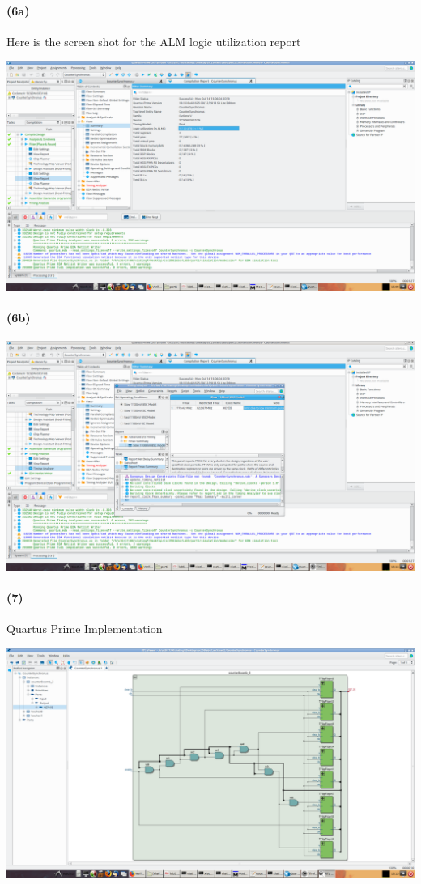 \documentclass{article}
\begin{document}
\paragraph{(6a)} Here is the screen shot for the ALM logic utilization report
\begin{center}
    \includegraphics[scale=0.25]{q1_6a.png}
\end{center}

\paragraph{(6b)} 
\begin{center}
    \includegraphics[scale=0.25]{q1_6b.png}
\end{center}

\paragraph{(7)} Quartus Prime Implementation
\begin{center}
    \includegraphics[scale=0.25]{q1_7.png}
\end{center}
\end{document}
